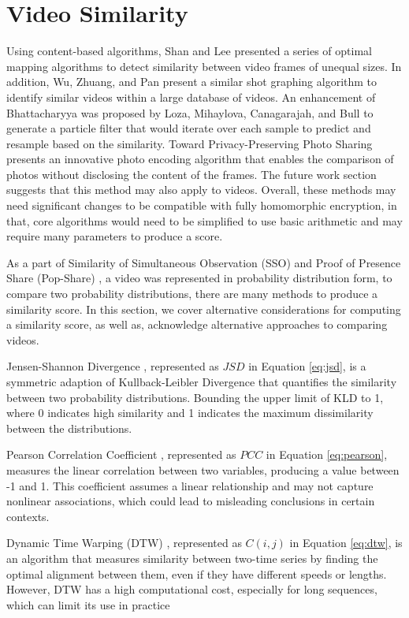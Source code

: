 \section{Video Similarity}

Using content-based algorithms, Shan and Lee \cite{Shan2002-sfs} presented a series of optimal mapping algorithms to detect similarity between video frames of unequal sizes. In addition, Wu, Zhuang, and Pan \cite{Wu2000-nf} present a similar shot graphing algorithm to identify similar videos within a large database of videos. An enhancement of Bhattacharyya was proposed by Loza, Mihaylova, Canagarajah, and Bull \cite{Loza2006-sso} to generate a particle filter that would iterate over each sample to predict and resample based on the similarity. Toward Privacy-Preserving Photo Sharing \cite{Ra2013-p3} presents an innovative photo encoding algorithm that enables the comparison of photos without disclosing the content of the frames. The future work section suggests that this method may also apply to videos. Overall, these methods may need significant changes to be compatible with fully homomorphic encryption, in that, core algorithms would need to be simplified to use basic arithmetic and may require many parameters to produce a score.

As a part of Similarity of Simultaneous Observation (SSO) \cite{Wu2019-SSO} and Proof of Presence Share (Pop-Share) \cite{Lagesse2021-PopShare}, a video was represented in probability distribution form, to compare two probability distributions, there are many methods to produce a similarity score. In this section, we cover alternative considerations for computing a similarity score, as well as, acknowledge alternative approaches to comparing videos.

Jensen-Shannon Divergence \cite{Lin1991-jsd}, represented as $JSD$ in Equation \ref{eq:jsd}, is a symmetric adaption of Kullback-Leibler Divergence that quantifies the similarity between two probability distributions. Bounding the upper limit of KLD to 1, where 0 indicates high similarity and 1 indicates the maximum dissimilarity between the distributions.



Pearson Correlation Coefficient \cite{Pearson1896-hp}, represented as $PCC$ in Equation \ref{eq:pearson}, measures the linear correlation between two variables, producing a value between -1 and 1. This coefficient assumes a linear relationship and may not capture nonlinear associations, which could lead to misleading conclusions in certain contexts. 



Dynamic Time Warping (DTW) \cite{Sakoe1978-dtw}, represented as $C(i,j)$ in Equation \ref{eq:dtw}, is an algorithm that measures similarity between two-time series by finding the optimal alignment between them, even if they have different speeds or lengths. However, DTW has a high computational cost, especially for long sequences, which can limit its use in practice


